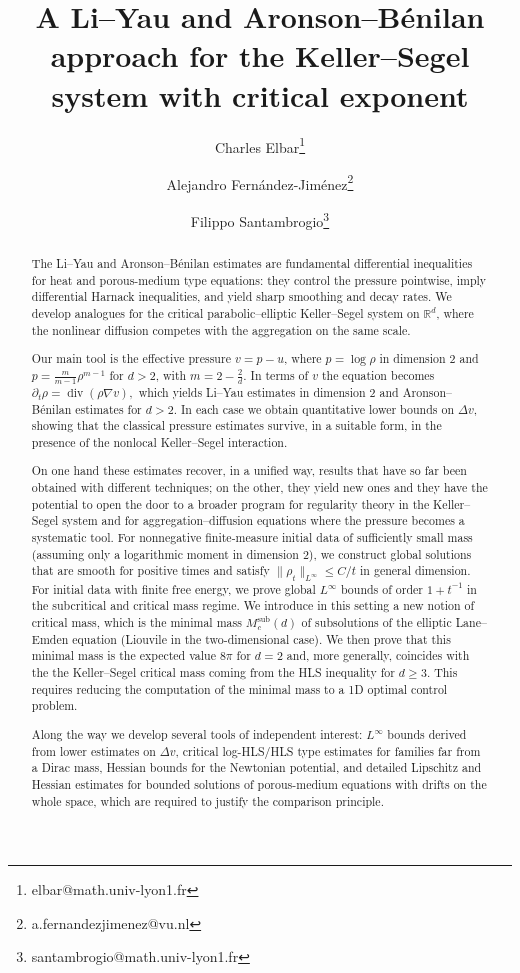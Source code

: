 \documentclass[11pt,a4paper]{article}
\title{A Li--Yau and Aronson--Bénilan approach for the Keller--Segel system with critical exponent}
\author[1]{Charles Elbar\thanks{elbar@math.univ-lyon1.fr}}
\author[1,2]{Alejandro Fernández-Jiménez\thanks{a.fernandezjimenez@vu.nl}}
\author[1]{Filippo Santambrogio\thanks{santambrogio@math.univ-lyon1.fr}}
\affil[1]{Universite Claude Bernard Lyon 1, ICJ UMR5208, CNRS, Ecole Centrale de Lyon, INSA Lyon, Université Jean Monnet, 69622 Villeurbanne, France.}
\affil[2]{Vrije Universiteit Amsterdam,
    Department of Mathematics,
    Faculteit der Exacte Wetenschappen,
    De Boelelaan 1081a,
    1081 HV Amsterdam, The Netherlands.}
\date{}
\numberwithin{equation}{section}
\theoremstyle{plain}
\theoremstyle{remark}
\begin{document}
\begin{singlespace}\maketitle\end{singlespace}

\begin{abstract}
The Li--Yau and Aronson--Bénilan estimates are fundamental differential inequalities for heat and porous-medium type equations: they control the pressure pointwise, imply differential Harnack inequalities, and yield sharp smoothing and decay rates. We develop analogues for the critical parabolic--elliptic Keller--Segel system on $\mathbb{R}^d$, where the nonlinear diffusion competes with the aggregation on the same scale.

Our main tool is the effective pressure $v=p-u$, where $p=\log\rho$ in dimension $2$ and $p=\frac{m}{m-1}\rho^{m-1}$ for $d>2$, with $m=2-\frac{2}{d}$. In terms of $v$ the equation becomes
$
\partial_t\rho=\operatorname{div}(\rho\nabla v),
$ 
which yields Li--Yau estimates in dimension $2$ and Aronson--Bénilan estimates for $d>2$. In each case we obtain quantitative lower bounds on $\Delta v$,
showing that the classical pressure estimates survive, in a suitable form, in the presence of the nonlocal Keller--Segel interaction.

On one hand these estimates recover, in a unified way, results that have so far been obtained with different techniques; on the other, they yield new ones and they have the potential to open the door to a broader program for regularity theory in the Keller--Segel system and for aggregation--diffusion equations where the pressure becomes a systematic tool. For nonnegative finite-measure initial data of sufficiently small mass (assuming only a logarithmic moment in dimension $2$), we construct global solutions that are smooth for positive times and satisfy $\|\rho_t\|_{L^\infty}\leq C/t$ in general dimension. For initial data with finite free energy, we prove global $L^\infty$ bounds of order $1+t^{-1}$ in the subcritical and critical mass regime. We introduce in this setting a new notion of critical mass, which is the minimal mass $M_c^{\mathrm{sub}}(d)$ of subsolutions of the elliptic Lane--Emden equation (Liouvile in the two-dimensional case). We then prove that this minimal mass is the expected value $8\pi$ for $d=2$ and, more generally, coincides with the the Keller--Segel critical mass coming from the HLS inequality for $d\geq 3$. This requires reducing the computation of the minimal mass to a 1D optimal control problem.

Along the way we develop several tools of independent interest: $L^\infty$ bounds derived from lower estimates on $\Delta v$, critical log-HLS/HLS type estimates for families far from a Dirac mass, Hessian bounds for the Newtonian potential, and detailed Lipschitz and Hessian estimates for bounded solutions of porous-medium equations with drifts on the whole space, which are required to justify the comparison principle.
\end{abstract}
\end{document}
